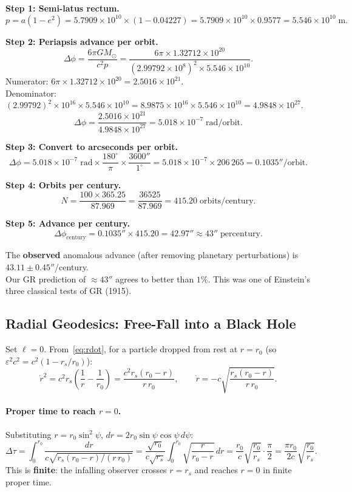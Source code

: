 \documentclass[12pt,a4paper]{article}
\theoremstyle{plain}
\theoremstyle{definition}
\theoremstyle{remark}
\newcommand{\leff}{\ell}  %
\begin{document}
\textbf{Step 1: Semi-latus rectum.}
\[
  p = a(1-e^2) = 5.7909\times10^{10}\times(1-0.04227) = 5.7909\times10^{10}\times 0.9577 = 5.546\times10^{10}\;\mathrm{m}.
\]

\textbf{Step 2: Periapsis advance per orbit.}
\[
  \Delta\phi = \frac{6\pi GM_\odot}{c^2 p}
  = \frac{6\pi\times1.32712\times10^{20}}{(2.99792\times10^8)^2\times5.546\times10^{10}}.
\]
Numerator: $6\pi\times1.32712\times10^{20} = 2.5016\times10^{21}$.\\
Denominator: $(2.99792)^2\times10^{16}\times5.546\times10^{10} = 8.9875\times10^{16}\times5.546\times10^{10} = 4.9848\times10^{27}$.
\[
  \Delta\phi = \frac{2.5016\times10^{21}}{4.9848\times10^{27}} = 5.018\times10^{-7}\;\mathrm{rad/orbit}.
\]

\textbf{Step 3: Convert to arcseconds per orbit.}
\[
  \Delta\phi = 5.018\times10^{-7}\;\mathrm{rad}\times\frac{180^\circ}{\pi}\times\frac{3600''}{1^\circ}
  = 5.018\times10^{-7}\times206\,265 = 0.1035''/\mathrm{orbit}.
\]

\textbf{Step 4: Orbits per century.}
\[
  N = \frac{100\times365.25}{87.969} = \frac{36525}{87.969} = 415.20\;\mathrm{orbits/century}.
\]

\textbf{Step 5: Advance per century.}
\[
  \boxed{\Delta\phi_{\mathrm{century}} = 0.1035''\times415.20 = 42.97'' \approx 43''\;\mathrm{per century.}}
\]

The \textbf{observed} anomalous advance (after removing planetary perturbations) is $43.11\pm0.45''$/century.\\
Our GR prediction of $\approx43''$ agrees to better than $1\%$. This was one of Einstein's three classical tests of GR (1915).

\subsection{Radial Geodesics: Free-Fall into a Black Hole}

Set $\leff=0$. From~\eqref{eq:rdot}, for a particle dropped from rest at $r=r_0$ (so $\varepsilon^2 c^2 = c^2(1-r_s/r_0)$):
\[
  \dot{r}^2 = c^2 r_s\!\left(\frac{1}{r}-\frac{1}{r_0}\right) = \frac{c^2r_s(r_0-r)}{r\,r_0},
  \qquad
  \dot{r} = -c\sqrt{\frac{r_s(r_0-r)}{r\,r_0}}.
\]

\paragraph{Proper time to reach $r=0$.}
Substituting $r = r_0\sin^2\psi$, $dr = 2r_0\sin\psi\cos\psi\,d\psi$:
\[
  \Delta\tau
  = \int_0^{r_0}\frac{dr}{c\sqrt{r_s(r_0-r)/(r\,r_0)}}
  = \frac{\sqrt{r_0}}{c\sqrt{r_s}}\int_0^{r_0}\sqrt{\frac{r}{r_0-r}}\,dr
  = \frac{r_0}{c}\sqrt{\frac{r_0}{r_s}}\cdot\frac{\pi}{2}
  = \frac{\pi r_0}{2c}\sqrt{\frac{r_0}{r_s}}.
\]
This is \textbf{finite}: the infalling observer crosses $r=r_s$ and reaches $r=0$ in finite proper time.
\end{document}
